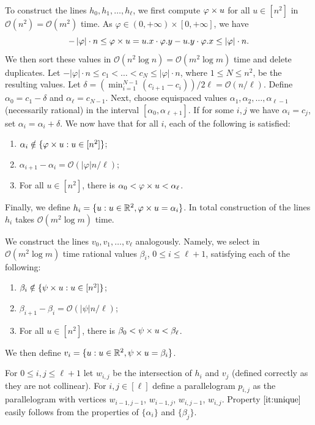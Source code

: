 \documentclass[11pt, letterpaper]{article}
\theoremstyle{plain}
\theoremstyle{definition}
\theoremstyle{remark}
\newcommand{\R}{\mathbb{R}}
\renewcommand{\O}{\mathcal{O}}
\renewcommand{\phi}{\varphi}
\newcommand{\absolute}[1]{\left\lvert#1\right\rvert}
\begin{document}
To construct the lines $h_0, h_1, \ldots, h_\ell$, we first compute $\h{u}$ for all $u \in [n^2]$ in $\O(n^2) = \O(m^2)$ time. As $\phi \in (0,+\infty) \times [0,+\infty]$, we have 
$$-\absolute{\phi} \cdot n \le \h{u} = \x{u} \cdot \y{\phi} - \y{u} \cdot \x{\phi} \le \absolute{\phi} \cdot n.$$
We then sort these values in $\O(n^2 \log n) = \O(m^2 \log m)$ time and delete duplicates. Let $-\absolute{\phi} \cdot n \le c_1 < \ldots < c_{N} \le \absolute{\phi} \cdot n$, where $1 \le N \le n^2$, be the resulting values. Let $\delta = (\min_{i=1}^{N-1} (c_{i+1}-c_i))/2\ell = \O(n/\ell)$. Define $\alpha_0 = c_1 -\delta$ and $\alpha_\ell = c_{N-1}$. Next, choose equispaced values $\alpha_1, \alpha_2, \ldots, \alpha_{\ell-1}$ (necessarily rational) in the interval $[\alpha_0, \alpha_{\ell+1}]$. If for some $i, j$ we have $\alpha_i = c_j$, set $\alpha_i = \alpha_i + \delta$. We now have that for all $i$, each of the following is satisfied:
\begin{enumerate}
\item $\alpha_i \notin \{\h{u} : u \in [n^2]\}$;
\item $\alpha_{i+1}-\alpha_i = \O(\absolute{\phi} n / \ell)$;
\item For all $u \in [n^2]$, there is $\alpha_0 < \h{u} < \alpha_\ell$.
\end{enumerate}
Finally, we define $h_i = \{u: u \in \R^2, \h{u} = \alpha_i\}$. In total construction of the lines $h_i$ takes $\O(m^2 \log m)$ time.

We construct the lines $v_0, v_1, \ldots, v_\ell$ analogously. Namely, we select in $\O(m^2 \log m)$ time rational values $\beta_i$, $0 \le i \le \ell+1$, satisfying each of the following:
\begin{enumerate}
\item $\beta_i \notin \{\psi \times u : u \in [n^2]\}$;
\item $\beta_{i+1}-\beta_i = \O(\absolute{\psi} n / \ell)$;
\item For all $u \in [n^2]$, there is $\beta_0 < \psi \times u < \beta_\ell$.
\end{enumerate}
We then define $v_i = \{u: u \in \R^2, \s{u} = \beta_i\}$. 

For $0 \le i,j \le \ell+1$ let $w_{i,j}$ be the intersection of $h_i$ and $v_j$ (defined correctly as they are not collinear). For $i,j \in [\ell]$ define a parallelogram $p_{i,j}$ as the parallelogram with vertices $w_{i-1,j-1}$, $w_{i-1,j}$, $w_{i,j-1}$, $w_{i,j}$. Property $\ref{it:unique}$ easily follows from the properties of $\{\alpha_i\}$ and $\{\beta_j\}$.
\end{document}
